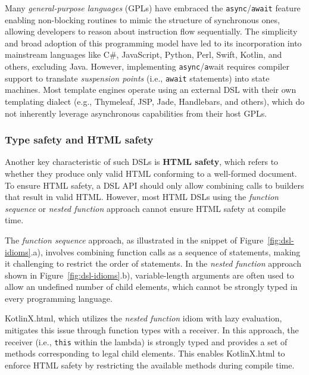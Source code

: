 Many \textit{general-purpose languages} (GPLs) have embraced the
\texttt{async}/\texttt{await} feature~\cite{async_await} enabling non-blocking
routines to mimic the structure of synchronous ones, allowing developers to
reason about instruction flow sequentially. The simplicity and broad adoption
of this programming model have led to its incorporation into mainstream
languages like C\#, JavaScript, Python, Perl, Swift, Kotlin, and others,
excluding Java. However, implementing \texttt{async}/\texttt{a}wait requires
compiler support to translate \textit{suspension points} (i.e., \texttt{await}
statements) into state machines. Most template engines operate using an
external DSL with their own templating dialect (e.g., Thymeleaf, JSP, Jade,
Handlebars, and others), which do not inherently leverage asynchronous
capabilities from their host GPLs.


\subsubsection{Type safety and HTML safety}

Another key characteristic of such DSLs is \textbf{HTML safety}, which refers
to whether they produce only valid HTML conforming to a well-formed document.
To ensure HTML safety, a DSL API should only allow combining calls to builders
that result in valid HTML. However, most HTML DSLs using the \textit{function
  sequence} or \textit{nested function} approach cannot ensure HTML safety at
compile time.

The \textit{function sequence} approach, as illustrated in the snippet of
Figure~\ref{fig:dsl-idioms}.a), involves combining function calls as a sequence
of statements, making it challenging to restrict the order of statements. In
the \textit{nested function} approach shown in Figure~\ref{fig:dsl-idioms}.b),
variable-length arguments are often used to allow an undefined number of child
elements, which cannot be strongly typed in every programming language.

KotlinX.html, which utilizes the \textit{nested function} idiom with lazy
evaluation, mitigates this issue through function types with a receiver. In
this approach, the receiver (i.e., \texttt{this} within the lambda) is strongly
typed and provides a set of methods corresponding to legal child elements. This
enables KotlinX.html to enforce HTML safety by restricting the available
methods during compile time.

